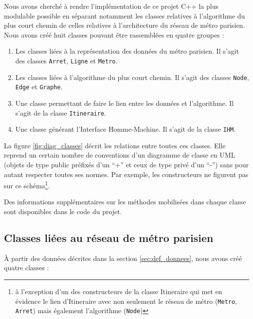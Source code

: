 \documentclass[,french]{article}
\let\rmarkdownfootnote\footnote%
\def\footnote{\protect\rmarkdownfootnote}
\begin{document}
Nous avons cherché à rendre l'implémentation de ce projet C++ la plus
modulable possible en séparant notamment les classes relatives à
l'algorithme du plus court chemin de celles relatives à l'architecture
du réseau de métro parisien. Nous avons créé huit classes pouvant être
rassemblées en quatre groupes :

\begin{enumerate}
\def\labelenumi{\arabic{enumi}.}
\item
  Les classes liées à la représentation des données du métro parisien.
  Il s'agit des classes \texttt{Arret}, \texttt{Ligne} et
  \texttt{Metro}.
\item
  Les classes liées à l'algorithme du plus court chemin. Il s'agit des
  classes \texttt{Node}, \texttt{Edge} et \texttt{Graphe}.
\item
  Une classe permettant de faire le lien entre les données et
  l'algorithme. Il s'agit de la classe \texttt{Itineraire}.
\item
  Une classe générant l'Interface Homme-Machine. Il s'agit de la classe
  \texttt{IHM}.
\end{enumerate}

La figure \ref{fig:diag_classes} décrit les relations entre toutes ces
classes. Elle reprend un certain nombre de conventions d'un diagramme de
classe en UML (objets de type public préfixés d'un ``+'' et ceux de type
privé d'un ``-'') sans pour autant respecter toutes ses normes. Par
exemple, les constructeurs ne figurent pas sur ce schéma\footnote{à
  l'exception d'un des constructeurs de la classe Itineraire qui met en
  évidence le lien d'Itineraire avec non seulement le réseau de métro
  (\texttt{Metro}, \texttt{Arret}) mais également l'algorithme
  (\texttt{Node}) }.

Des informations supplémentaires sur les méthodes mobilisées dans chaque
classe sont disponibles dans le code du projet.

\hypertarget{classes-liuxe9es-au-ruxe9seau-de-muxe9tro-parisien}{%
\subsection{Classes liées au réseau de métro
parisien}\label{classes-liuxe9es-au-ruxe9seau-de-muxe9tro-parisien}}

À partir des données décrites dans la section \ref{sec:def_donnees},
nous avons créé quatre classes :
\end{document}

